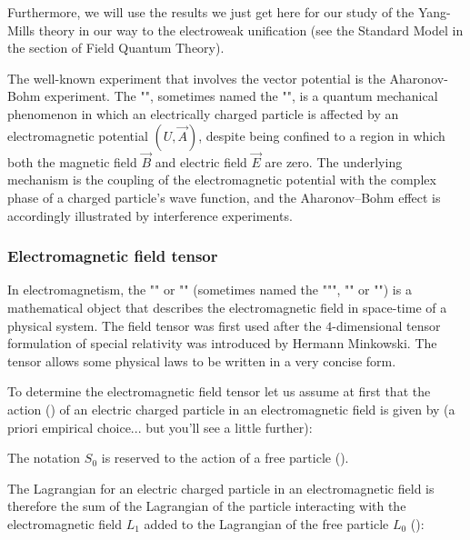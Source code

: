 	Furthermore, we will use the results we just get here for our study of the Yang-Mills theory in our way to the electroweak unification (see the Standard Model in the section of Field Quantum Theory). 
	\begin{tcolorbox}[title=Remark,colframe=black,arc=10pt]
	The well-known experiment that involves the vector potential is the Aharonov-Bohm experiment. The "", sometimes named the "", is a quantum mechanical phenomenon in which an electrically charged particle is affected by an electromagnetic potential $(U, \vec{A})$, despite being confined to a region in which both the magnetic field $\vec{B}$ and electric field $\vec{E}$ are zero. The underlying mechanism is the coupling of the electromagnetic potential with the complex phase of a charged particle's wave function, and the Aharonov–Bohm effect is accordingly illustrated by interference experiments.
	\end{tcolorbox}
	
	\subsubsection{Electromagnetic field tensor}
	In electromagnetism, the "\label{electromagnetic tensor}" or "" (sometimes named the """, "\label{faradey tensor}" or "") is a mathematical object that describes the electromagnetic field in space-time of a physical system. The field tensor was first used after the $4$-dimensional tensor formulation of special relativity was introduced by Hermann Minkowski. The tensor allows some physical laws to be written in a very concise form.
	
	To determine the electromagnetic field tensor let us assume at first that the action () of an electric charged particle in an electromagnetic field is given by (a priori empirical choice... but you'll see a little further):
	
	\begin{tcolorbox}[title=Remark,colframe=black,arc=10pt]
	The notation $S_0$ is reserved to the action of a free particle ().
	\end{tcolorbox}
	The Lagrangian for an electric charged particle in an electromagnetic field is therefore the sum of the Lagrangian of the particle interacting with the electromagnetic field $L_1$ added to the Lagrangian of the free particle $L_0$ ():
	
